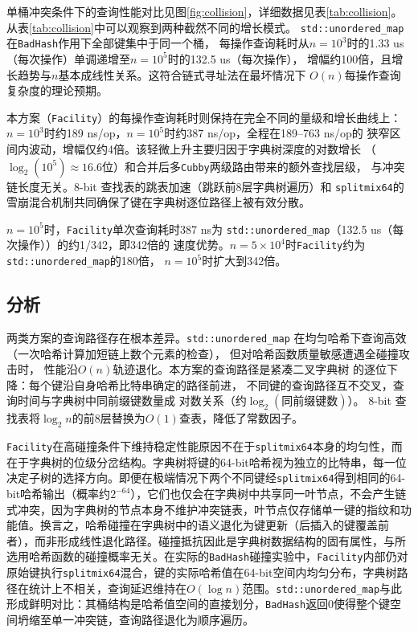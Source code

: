 \documentclass[
    type = bachelor,
    fontset = win,
    decl-page = true,
  ]{njuthesis}
\begin{document}
单桶冲突条件下的查询性能对比见图\ref{fig:collision}，详细数据见表\ref{tab:collision}。
从表\ref{tab:collision}中可以观察到两种截然不同的增长模式。
\texttt{std::unordered\_map}在\texttt{BadHash}作用下全部键集中于同一个桶，
每操作查询耗时从$n=10^3$时的1.33 us（每次操作）单调递增至$n=10^5$时的132.5 us（每次操作），
增幅约100倍，且增长趋势与$n$基本成线性关系。这符合链式寻址法在最坏情况下
$O(n)$每操作查询复杂度的理论预期。

本方案（\texttt{Facility}）的每操作查询耗时则保持在完全不同的量级和增长曲线上：
$n=10^3$时约189 ns/op，$n=10^5$时约387 ns/op，全程在189--763 ns/op的
狭窄区间内波动，增幅仅约4倍。该轻微上升主要归因于字典树深度的对数增长
（$\log_2(10^5) \approx 16.6$位）和合并后多\texttt{Cubby}两级路由带来的额外查找层级，
与冲突链长度无关。8-bit 查找表的跳表加速（跳跃前8层字典树遍历）和
\texttt{splitmix64}的雪崩混合机制共同确保了键在字典树逐位路径上被有效分散。

$n=10^5$时，\texttt{Facility}单次查询耗时387 ns为
\texttt{std::unordered\_map}（132.5 us（每次操作））的约1/342，即342倍的
速度优势。$n=5\times10^4$时\texttt{Facility}约为\texttt{std::unordered\_map}的180倍，
$n=10^5$时扩大到342倍。

\subsection{分析}

两类方案的查询路径存在根本差异。\texttt{std::unordered\_map}
在均匀哈希下查询高效（一次哈希计算加短链上数个元素的检查），
但对哈希函数质量敏感遭遇全碰撞攻击时，
性能沿$O(n)$轨迹退化。本方案的查询路径是紧凑二叉字典树
的逐位下降：每个键沿自身哈希比特串确定的路径前进，
不同键的查询路径互不交叉，查询时间与字典树中同前缀键数量成
对数关系（约$\log_2(\text{同前缀键数})$）。
8-bit 查找表将$\log_2 n$的前8层替换为$O(1)$查表，降低了常数因子。

\texttt{Facility}在高碰撞条件下维持稳定性能原因不在于\texttt{splitmix64}本身的均匀性，而在于字典树的位级分岔结构。字典树将键的64-bit哈希视为独立的比特串，每一位决定子树的选择方向。即便在极端情况下两个不同键经\texttt{splitmix64}得到相同的64-bit哈希输出（概率约$2^{-64}$），它们也仅会在字典树中共享同一叶节点，不会产生链式冲突，因为字典树的节点本身不维护冲突链表，叶节点仅存储单一键的指纹和功能值。换言之，哈希碰撞在字典树中的语义退化为键更新（后插入的键覆盖前者），而非形成线性退化路径。碰撞抵抗因此是字典树数据结构的固有属性，与所选用哈希函数的碰撞概率无关。在实际的\texttt{BadHash}碰撞实验中，\texttt{Facility}内部仍对原始键执行\texttt{splitmix64}混合，键的实际哈希值在64-bit空间内均匀分布，字典树路径在统计上不相关，查询延迟维持在$O(\log n)$范围。\texttt{std::unordered\_map}与此形成鲜明对比：其桶结构是哈希值空间的直接划分，\texttt{BadHash}返回0使得整个键空间坍缩至单一冲突链，查询路径退化为顺序遍历。
\end{document}
